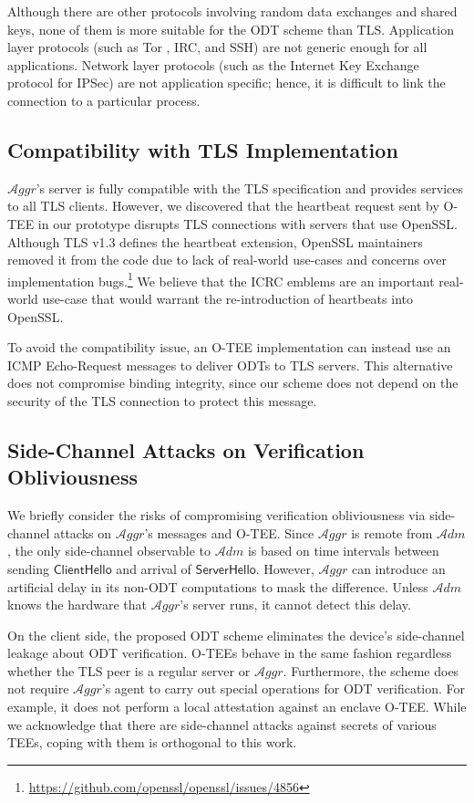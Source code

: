 \documentclass[letterpaper,twocolumn,10pt]{article}
\newcommand{\T}{\ensuremath{\mathcal{A}ggr}\xspace}
\newcommand{\ADM}{\ensuremath{\mathcal{A}dm}\xspace}
\begin{document}
Although there are other protocols involving random data exchanges and shared keys, none of them is more suitable
for the ODT scheme than TLS. Application layer protocols (such as Tor \cite{TOR}, IRC, and SSH) are not generic
enough for all applications. Network layer protocols (such as the Internet Key Exchange protocol \cite{IKE} for IPSec)
are not application specific; hence, it is difficult to link the connection to a particular process.

\subsection{Compatibility with TLS Implementation}
\label{sec:TLS-compatibility}
%
\T's server is fully compatible with the TLS specification and provides services to all TLS clients.
However, we discovered that the heartbeat request sent by O-TEE in our prototype disrupts TLS
connections with servers that use OpenSSL.
Although TLS v1.3 \cite{TLS13} defines the heartbeat extension, OpenSSL maintainers
removed it from the code due to lack of real-world use-cases and concerns over implementation
bugs.\footnote{\url{https://github.com/openssl/openssl/issues/4856}}
We believe that the ICRC emblems are an important real-world use-case that would warrant the
re-introduction of heartbeats into OpenSSL.

To avoid the compatibility issue, an O-TEE implementation can instead use an ICMP Echo-Request messages
to deliver ODTs to TLS servers. This alternative does not compromise binding integrity, since
our scheme does not depend on the security of the TLS connection to protect this message.

\subsection{Side-Channel Attacks on Verification Obliviousness}
\label{sec:sidechannel}
%
We briefly consider the risks of compromising verification obliviousness via side-channel attacks
on \T's messages and O-TEE. Since \T is remote from \ADM, the only side-channel observable to \ADM is
based on time intervals between sending $\mathsf{ClientHello}$ and arrival of $\mathsf{ServerHello}$.
However, \T can introduce an artificial delay in its non-ODT computations to mask the difference.
Unless \ADM knows the hardware that \T's server runs, it cannot detect this delay.

On the client side, the proposed ODT scheme eliminates the device's side-channel leakage about
ODT verification. O-TEEs behave in the same fashion regardless whether the TLS peer is a regular server or \T.
Furthermore, the scheme does not require \T's agent to carry out special operations for ODT verification.
For example, it does not perform a local attestation against an enclave O-TEE. While we acknowledge
that there are side-channel attacks against secrets of various TEEs, coping with them
is orthogonal to this work.
\end{document}
